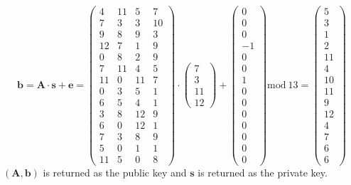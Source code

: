 \documentclass[a4paper, 11pt, openany]{book}
\numberwithin{equation}{section}
\theoremstyle{plain}
\theoremstyle{definition}
\begin{document}
$$ 
\textbf{b} = \textbf{A}\cdot \textbf{s} + \textbf{e}
 =  \begin{pmatrix}  
 4& 11&  5&  7\\
 7&  3&  3& 10\\
 9&  8&  9&  3\\
 12&  7&  1&  9\\
 0&  8&  2&  9\\
 7& 11&  4&  5\\
 11&  0& 11&  7\\
 0&  3&  5&  1\\
 6&  5&  4&  1\\
 3&  8& 12&  9\\
 6&  0& 12&  1\\
 7&  3&  8&  9\\
 5&  0&  1&  1\\
 11&  5&  0&  8
 \end{pmatrix} \cdot
  \begin{pmatrix} 7 \\ 3 \\ 11 \\ 12\end{pmatrix}
  +
  \begin{pmatrix}0\\0\\0\\-1\\0\\0\\1\\0\\0\\0\\0\\0\\0\\0\end{pmatrix}
  \text{mod}~13 =\begin{pmatrix}
  	5\\3\\1\\2\\11\\4\\10\\11\\9\\12\\4\\7\\6\\6
  \end{pmatrix}
$$
$(\textbf{A},\textbf{b})$ is returned as the public key and $\textbf{s}$ is returned as the private key.
\end{document}

